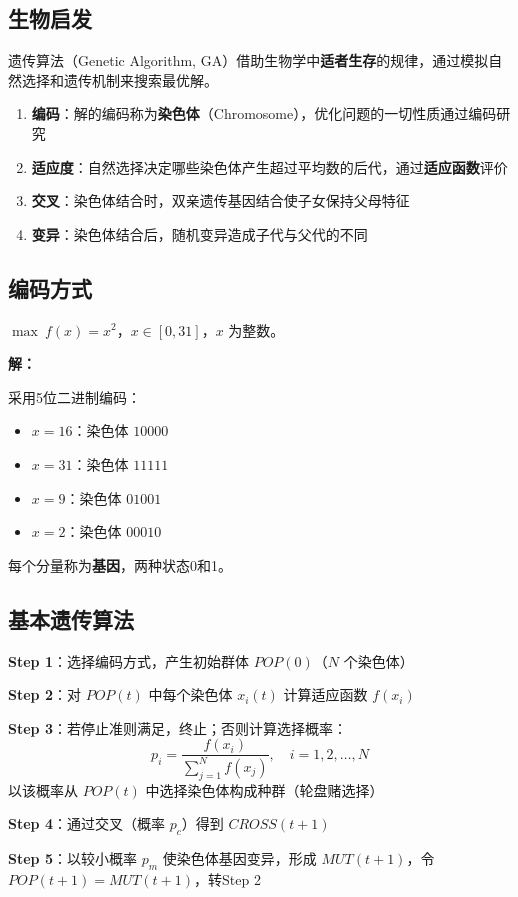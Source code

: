 \subsection{生物启发}

遗传算法（Genetic Algorithm, GA）借助生物学中\textbf{适者生存}的规律，通过模拟自然选择和遗传机制来搜索最优解。

\begin{conceptbox}[遗传算法的核心特点]
\begin{enumerate}[label=\arabic*., leftmargin=2em]
    \item \textbf{编码}：解的编码称为\textbf{染色体}（Chromosome），优化问题的一切性质通过编码研究
    \item \textbf{适应度}：自然选择决定哪些染色体产生超过平均数的后代，通过\textbf{适应函数}评价
    \item \textbf{交叉}：染色体结合时，双亲遗传基因结合使子女保持父母特征
    \item \textbf{变异}：染色体结合后，随机变异造成子代与父代的不同
\end{enumerate}
\end{conceptbox}

\subsection{编码方式}

\begin{example}[二进制编码]
$\max\ f(x) = x^2$，$x \in [0, 31]$，$x$ 为整数。

\textbf{解：}

采用5位二进制编码：
\begin{itemize}
    \item $x = 16$：染色体 $10000$
    \item $x = 31$：染色体 $11111$
    \item $x = 9$：染色体 $01001$
    \item $x = 2$：染色体 $00010$
\end{itemize}
每个分量称为\textbf{基因}，两种状态0和1。
\end{example}

\subsection{基本遗传算法}

\begin{algobox}[遗传算法]
\textbf{Step 1}：选择编码方式，产生初始群体 $POP(0)$（$N$ 个染色体）

\textbf{Step 2}：对 $POP(t)$ 中每个染色体 $x_i(t)$ 计算适应函数 $f(x_i)$

\textbf{Step 3}：若停止准则满足，终止；否则计算选择概率：
\[
p_i = \frac{f(x_i)}{\sum_{j=1}^{N} f(x_j)},\quad i = 1, 2, \ldots, N
\]
以该概率从 $POP(t)$ 中选择染色体构成种群（轮盘赌选择）

\textbf{Step 4}：通过交叉（概率 $p_c$）得到 $CROSS(t+1)$

\textbf{Step 5}：以较小概率 $p_m$ 使染色体基因变异，形成 $MUT(t+1)$，令 $POP(t+1) = MUT(t+1)$，转Step 2
\end{algobox}

